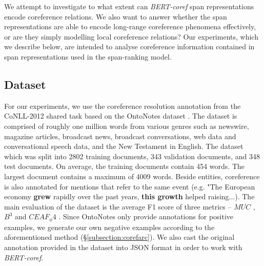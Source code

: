 \documentclass[11pt]{article}
\begin{document}


We attempt to investigate to what extent can \textit{BERT-coref} span representations encode coreference relations. We also want to answer whether the span representations are able to encode long-range coreference phenomena effectively, or are they simply modelling local coreference relations? Our experiments, which we describe below, are intended to analyse coreference information contained in span representations used in the span-ranking model. 

\subsection{Dataset}
For our experiments, we use the coreference resolution annotation
from the CoNLL-2012 shared task based on the OntoNotes dataset \parencite{conll}. The dataset is comprised of roughly one million words from various genres such as newswire, magazine articles, broadcast news, broadcast conversations, web data and conversational speech data, and the New Testament in English. The dataset which was split into 2802 training documents, 343 validation documents, and 348 test documents. On average, the training documents contain 454 words. The largest document contains a maximum of 4009 words. Beside entities, coreference is also annotated for mentions that refer to the same event (e.g. "The European economy \textbf{grew} rapidly over the past years, \textbf{this growth} helped raising...). The main evaluation of the dataset is the average F1 score of three metrics – $MUC$ \parencite{vilain-etal-1995-model}, $B^3$ \parencite{Bagga98algorithmsfor} and $CEAF_ \phi4$ \parencite{luo-2005-coreference}. Since OntoNotes only provide annotations for positive examples, we generate our own negative examples according to the aforementioned method (\S \ref{subsection:corefarc}). We also cast the original annotation provided in the dataset into JSON format in order to work with \textit{BERT-coref}. 
\end{document}

